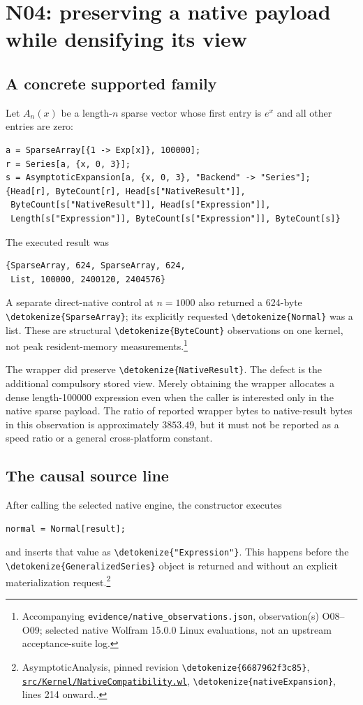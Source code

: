 \documentclass[11pt]{article}
\newcommand{\code}[1]{{\ttfamily\expandafter\nolinkurl\expandafter{\detokenize{#1}}}}
\newcommand{\repo}{https://github.com/VladimirReshetnikov/Asymptotic/blob/6687962f3c858a4f93623cfc496f33e35c6763d4/}
\newcommand{\src}[2]{\footnote{AsymptoticAnalysis, pinned revision \code{6687962f3c85}, \href{\repo#1}{\nolinkurl{#1}}, #2.}}
\newcommand{\obs}[1]{\footnote{Accompanying \nolinkurl{evidence/native_observations.json}, observation(s) #1; selected native Wolfram 15.0.0 Linux evaluations, not an upstream acceptance-suite log.}}
\begin{document}
\section{N04: preserving a native payload while densifying its view}
\label{sec:n04}

\subsection{A concrete supported family}
Let $A_n(x)$ be a length-$n$ sparse vector whose first entry is $e^x$ and all other entries are zero:
\begin{lstlisting}
a = SparseArray[{1 -> Exp[x]}, 100000];
r = Series[a, {x, 0, 3}];
s = AsymptoticExpansion[a, {x, 0, 3}, "Backend" -> "Series"];
{Head[r], ByteCount[r], Head[s["NativeResult"]],
 ByteCount[s["NativeResult"]], Head[s["Expression"]],
 Length[s["Expression"]], ByteCount[s["Expression"]], ByteCount[s]}
\end{lstlisting}
The executed result was
\begin{lstlisting}
{SparseArray, 624, SparseArray, 624,
 List, 100000, 2400120, 2404576}
\end{lstlisting}
A separate direct-native control at $n=1000$ also returned a 624-byte \code{SparseArray}; its explicitly requested \code{Normal} was a list. These are structural \code{ByteCount} observations on one kernel, not peak resident-memory measurements.\obs{O08--O09}

The wrapper did preserve \code{NativeResult}. The defect is the additional compulsory stored view. Merely obtaining the wrapper allocates a dense length-100000 expression even when the caller is interested only in the native sparse payload. The ratio of reported wrapper bytes to native-result bytes in this observation is approximately $3853.49$, but it must not be reported as a speed ratio or a general cross-platform constant.

\subsection{The causal source line}
After calling the selected native engine, the constructor executes
\begin{lstlisting}
normal = Normal[result];
\end{lstlisting}
and inserts that value as \code{"Expression"}. This happens before the \code{GeneralizedSeries} object is returned and without an explicit materialization request.\src{src/Kernel/NativeCompatibility.wl}{\code{nativeExpansion}, lines 214 onward.}
\end{document}
